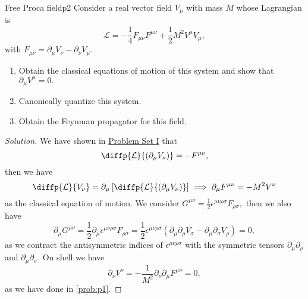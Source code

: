 \begin{problem}{Free Proca field}{p2}
   Consider a real vector field \(V_\mu\) with mass \(M\) whose Lagrangian is
   \begin{equation*}
      \mathcal{L} = - \frac14 F_{\mu \nu} F^{\mu\nu} + \frac12 M^2 V^\mu V_\mu,
   \end{equation*}
   with \(F_{\mu\nu} = \partial_\mu V_\nu - \partial_\nu V_\mu.\)
   \begin{enumerate}[label=(\alph*)]
       \item Obtain the classical equations of motion of this system and show that \(\partial_\mu V^\mu = 0.\)
       \item Canonically quantize this system.
   \item Obtain the Feynman propagator for this field.
   \end{enumerate}
\end{problem}
\begin{proof}[Solution]
   We have shown in \href{https://github.com/louisradial/4305107-quantum-field-theory-i/releases/tag/pset1}{Problem Set I} that
   \begin{equation*}
      \diffp{\mathcal{L}}{(\partial_\mu V_\nu)} = -F^{\mu \nu},
   \end{equation*}
   then we have
   \begin{equation*}
      \diffp{\mathcal{L}}{V_\nu} = \partial_\mu \left[\diffp{\mathcal{L}}{(\partial_\mu V_\nu)}\right] \implies \partial_\mu F^{\mu\nu} = - M^2 V^\nu
   \end{equation*}
   as the classical equation of motion. We consider \(G^{\mu\nu} = \frac12 \epsilon^{\mu \nu \rho \sigma} F_{\rho \sigma},\) then we also have
   \begin{equation*}
      \partial_\mu G^{\mu\nu} = \frac12 \partial_\mu \epsilon^{\mu \nu \rho \sigma} F_{\rho \sigma} = \frac12  \epsilon^{\mu\nu \rho \sigma} \left(\partial_\mu\partial_{\rho}V_{\sigma} - \partial_\mu \partial_{\sigma} V_{\rho}\right) = 0,
   \end{equation*}
   as we contract the antisymmetric indices of \(\epsilon^{\mu\nu \rho \sigma}\) with the symmetric tensors \(\partial_\mu \partial_\rho\) and \(\partial_\mu \partial_\sigma.\) On shell we have
   \begin{equation*}
      \partial_\nu V^\nu = -\frac{1}{M^2}\partial_\nu \partial_\mu F^{\mu\nu} = 0,
   \end{equation*}
   as we have done in \cref{prob:p1}.
\end{proof}
